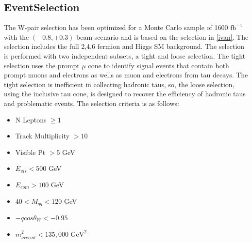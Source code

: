 \subsection{EventSelection}
\label{subsec:EventSelection}
The W-pair selection has been optimized for a Monte Carlo sample of 1600 $\text{fb}^{−1}$ with the $(-0.8,+0.3)$ beam scenario and is based on the selection in \ref{ivan}. The selection includes the full 2,4,6 fermion and Higgs SM background. The selection is performed with two independent subsets, a tight and loose selection. The tight selection uses the prompt $\mu$ cone to identify signal events that contain both prompt muons and electrons as wells as muon and electrons from tau decays. The tight selection is inefficient in collecting hadronic taus, so, the loose selection, using the inclusive tau cone, is designed to recover the efficiency of hadronic taus and problematic events. The selection criteria is as follows:
\begin{itemize}
\item N Leptons $\geq 1$
\item Track Multiplicity $> 10$  
\item Visible Pt $> 5$ GeV  
\item $E_{vis} < 500$ GeV 
\item $E_{com} > 100$ GeV
\item $40<M_{qq}<120$ GeV
\item  $-qcos\theta_W < -0.95$
\item  $m^2_{\nu recoil} < 135,000 \, \, \text{GeV}^2$
\end{itemize}

